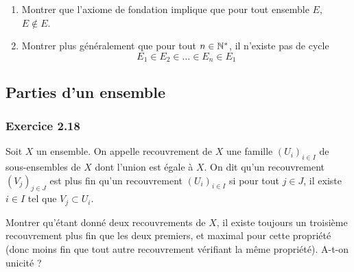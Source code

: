 \documentclass[a4paper,french,bookmarks]{article}
\begin{document}
    \begin{enumerate}
        \item Montrer que l'axiome de fondation implique que pour tout ensemble $E$, $E \not\in E$.


        \item Montrer plus généralement que pour tout $n \in \mathbb{N}^*$, il n'existe pas de cycle 
        \[ E_1 \in E_2 \in \dots \in E_n \in E_1 \]

    \end{enumerate}

    \subsection{Parties d'un ensemble}

    \subsubsection*{Exercice 2.18}
    
    Soit $X$ un ensemble. On appelle recouvrement de $X$ une famille $\left(U_i\right)_{i \in I}$ de sous-ensembles de $X$ dont l'union est égale à $X$. On dit qu'un recouvrement $\left(V_j\right)_{j \in J}$ est plus fin qu'un recouvrement $\left(U_i\right)_{i \in I}$ si pour tout $j \in J$, il existe $i \in I$ tel que $V_j \subset U_i$.
    
    Montrer qu'étant donné deux recouvrements de $X$, il existe toujours un troisième recouvrement plus fin que les deux premiers, et maximal pour cette propriété (donc moins fin que tout autre recouvrement vérifiant la même propriété). A-t-on unicité ?
\end{document}
